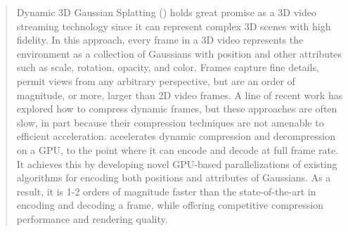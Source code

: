 \begin{abstract}
  Dynamic 3D Gaussian Splatting (\gs{}) holds great promise as a 3D video streaming technology since it can represent complex 3D scenes with high fidelity. 
  In this approach, every frame in a 3D video represents the environment as a collection of Gaussians with position and other attributes such as scale, rotation, opacity, and color. 
  Frames capture fine details, permit views from any arbitrary perspective, but are an order of magnitude, or more, larger than 2D video frames.
  A line of recent work has explored how to compress dynamic \gs{} frames, but these approaches are often slow, in part because their compression techniques are not amenable to efficient acceleration. 
  \gsnfs{} accelerates dynamic \gs{} compression and decompression on a GPU, to the point where it can encode and decode at full frame rate. 
  It achieves this by developing novel GPU-based parallelizations of existing algorithms for encoding both positions and attributes of Gaussians.
  As a result, it is 1-2 orders of magnitude faster than the state-of-the-art in encoding and decoding a frame, while offering competitive compression performance and rendering quality.
\end{abstract}


